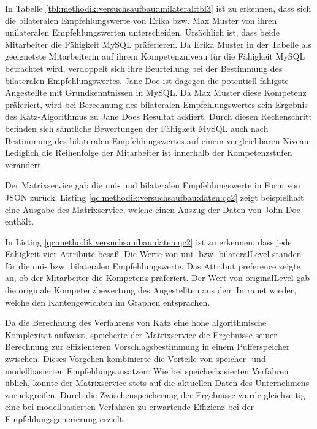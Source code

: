 \newpage
In Tabelle \ref{tbl:methodik:versuchsaufbau:unilateral:tbl3} ist zu erkennen, dass sich die bilateralen Empfehlungswerte von Erika bzw. Max Muster von ihren unilateralen Empfehlungswerten unterscheiden. Ursächlich ist, dass beide Mitarbeiter die Fähigkeit MySQL präferieren. Da Erika Muster in der Tabelle als geeignetste Mitarbeiterin auf ihrem Kompetenzniveau für die Fähigkeit MySQL betrachtet wird, verdoppelt sich ihre Beurteilung bei der Bestimmung des bilateralen Empfehlungswertes. Jane Doe ist dagegen die potentiell fähigste Angestellte mit Grundkenntnissen in MySQL. Da Max Muster diese Kompetenz präferiert, wird bei Berechnung des bilateralen Empfehlungswertes sein Ergebnis des Katz-Algorithmus zu Jane Does Resultat addiert. Durch diesen Rechenschritt befinden sich sämtliche Bewertungen der Fähigkeit MySQL auch nach Bestimmung des bilateralen Empfehlungswertes auf einem vergleichbaren Niveau. Lediglich die Reihenfolge der Mitarbeiter ist innerhalb der Kompetenzstufen verändert.

Der Matrixservice gab die uni- und bilateralen Empfehlungswerte in Form von JSON zurück. Listing \ref{qc:methodik:versuchsaufbau:daten:qc2} zeigt beispielhaft eine Ausgabe des Matrixservice, welche einen Auszug der Daten von John Doe enthält.



In Listing \ref{qc:methodik:versuchsaufbau:daten:qc2} ist zu erkennen, dass jede Fähigkeit vier Attribute besaß. Die Werte von uni- bzw. bilateralLevel standen für die uni- bzw. bilateralen Empfehlungswerte. Das Attribut preference zeigte an, ob der Mitarbeiter die Kompetenz präferiert. Der Wert von originalLevel gab die originale Kompetenzbewertung des Angestellten aus dem Intranet wieder, welche den Kantengewichten im Graphen entsprachen.

Da die Berechnung des Verfahrens von Katz eine hohe algorithmische Komplexität aufweist, speicherte der Matrixservice die Ergebnisse seiner Berechnung zur effizienteren Vorschlagsbestimmung in einem Pufferspeicher zwischen. Dieses Vorgehen kombinierte die Vorteile von speicher- und modellbasierten Empfehlungsansätzen: Wie bei speicherbasierten Verfahren üblich, konnte der Matrixservice stets auf die aktuellen Daten des Unternehmens zurückgreifen. Durch die Zwischenspeicherung der Ergebnisse wurde gleichzeitig eine bei modellbasierten Verfahren zu erwartende Effizienz bei der Empfehlungsgenerierung erzielt.


